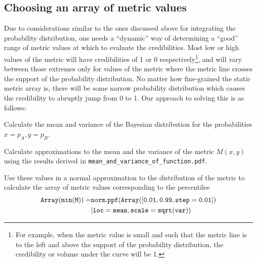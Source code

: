 \documentclass[letterpaper,12pt]{article}
\newcommand{\beq}{\begin{equation}} %
\newcommand{\eeq}{\end{equation}} %
\begin{document}
\subsection{Choosing an array of metric values}
Due to considerations similar to the ones discussed above for
integrating the probability distribution, one needs a ``dynamic'' way
of determining a ``good'' range of metric values at which to evaluate
the credibilities. Most low or high values of the metric will have
credibilities of 1 or 0 respectively\footnote{For example, when the
  metric value is small and such that the metric line is to the left and above
  the support of the probability distribution, the credibility or
  volume under the curve will be 1.}, and will vary between those
extremes only for values of the metric where the metric line crosses the
support of the probability distribution. No matter how fine-grained
the static metric array is, there will be some narrow probability
distribution which causes the credibility to abruptly jump from 0 to
1. Our approach to solving this is as follows:
\be
\item Calculate the mean and variance of the Bayesian distribution for the probabilities \(x=p_A, y=p_B\).
\item Calculate approximations to the mean and the variance of the metric \(M(x,y)\) using the results derived in {\tt mean\_and\_variance\_of\_function.pdf}.
\item Use these values in a normal approximation to the distribution of the metric to calculate the array of metric values corresponding to the percentiles
  \beq
  \begin{split}
    {\tt Array(min(M))} = &{\tt norm.ppf(Array([0.01, 0.99, step = 0.01])}\\
      &{\tt |loc = mean, scale = sqrt(var))}
    \end{split}
\eeq
\ee
\end{document}
